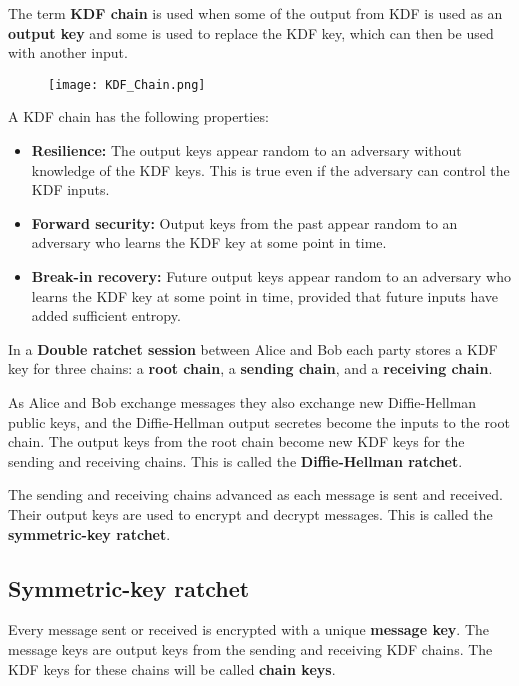 The term \textbf{KDF chain} is used when some of the output from KDF is used as an \textbf{output key} and some is used to replace the KDF key, which can then be used with another input.

\begin{figure}[ht!]
  \texttt{[image: KDF\_Chain.png]}
  \centering
\end{figure}

A KDF chain has the following properties:

\begin{itemize}
  \item \textbf{Resilience:} The output keys appear random to an adversary without knowledge of the KDF keys. This is true even if the adversary can control the KDF inputs.
  \item \textbf{Forward security:} Output keys from the past appear random to an adversary who learns the KDF key at some point in time.
  \item \textbf{Break-in recovery:} Future output keys appear random to an adversary who learns the KDF key at some point in time, provided that future inputs have added sufficient entropy.
\end{itemize}

In a \textbf{Double ratchet session} between Alice and Bob each party stores a KDF key for three chains: a \textbf{root chain}, a \textbf{sending chain}, and a \textbf{receiving chain}.

As Alice and Bob exchange messages they also exchange new Diffie-Hellman public keys, and the Diffie-Hellman output secretes become the inputs to the root chain. The output keys from the root chain become new KDF keys for the sending and receiving chains. This is called the \textbf{Diffie-Hellman ratchet}.

The sending and receiving chains advanced as each message is sent and received. Their output keys are used to encrypt and decrypt messages. This is called the \textbf{symmetric-key ratchet}.

\subsection{Symmetric-key ratchet}
\label{subsec: Symmetric-keyRatchet}

Every message sent or received is encrypted with a unique \textbf{message key}. The message keys are output keys from the sending and receiving KDF chains. The KDF keys for these chains will be called \textbf{chain keys}.

